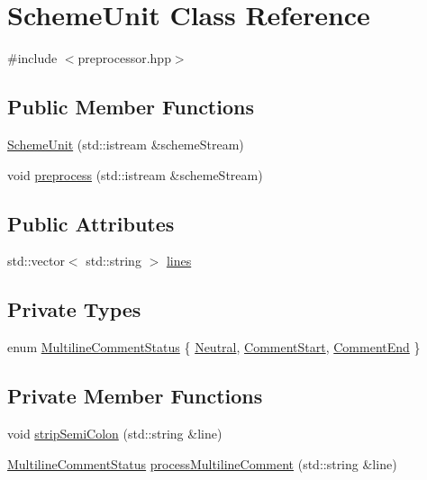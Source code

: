 \hypertarget{class_scheme_unit}{}\section{Scheme\+Unit Class Reference}
\label{class_scheme_unit}


{\ttfamily \#include $<$preprocessor.\+hpp$>$}

\subsection*{Public Member Functions}
\begin{DoxyCompactItemize}
\item 
\hyperlink{class_scheme_unit_a403e550c702c23689ff9be1d40a5847c}{Scheme\+Unit} (std\+::istream \&scheme\+Stream)
\item 
void \hyperlink{class_scheme_unit_a2dde8109fffd4bb83f74f5788253ffb2}{preprocess} (std\+::istream \&scheme\+Stream)
\end{DoxyCompactItemize}
\subsection*{Public Attributes}
\begin{DoxyCompactItemize}
\item 
std\+::vector$<$ std\+::string $>$ \hyperlink{class_scheme_unit_a03fe6130875cfc25975efc5a6f7981da}{lines}
\end{DoxyCompactItemize}
\subsection*{Private Types}
\begin{DoxyCompactItemize}
\item 
enum \hyperlink{class_scheme_unit_a90a5ac4883401fe1c38226a54ce9f43d}{Multiline\+Comment\+Status} \{ \hyperlink{class_scheme_unit_a90a5ac4883401fe1c38226a54ce9f43dafd3c8126c0b4840138b5586975c6c24e}{Neutral}, 
\hyperlink{class_scheme_unit_a90a5ac4883401fe1c38226a54ce9f43da92f34af4ca75d006abe1f83629308d9d}{Comment\+Start}, 
\hyperlink{class_scheme_unit_a90a5ac4883401fe1c38226a54ce9f43da9e9ce5882d904a46fe5fc0daa9f7194a}{Comment\+End}
 \}
\end{DoxyCompactItemize}
\subsection*{Private Member Functions}
\begin{DoxyCompactItemize}
\item 
void \hyperlink{class_scheme_unit_ae40572c01bc15883f4bb0d69044f859f}{strip\+Semi\+Colon} (std\+::string \&line)
\item 
\hyperlink{class_scheme_unit_a90a5ac4883401fe1c38226a54ce9f43d}{Multiline\+Comment\+Status} \hyperlink{class_scheme_unit_a0d43b5caa10f37002e656efadedba4bc}{process\+Multiline\+Comment} (std\+::string \&line)
\end{DoxyCompactItemize}
